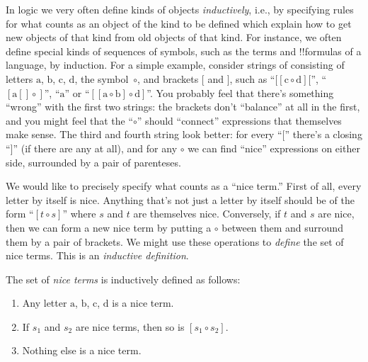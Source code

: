 \documentclass[../../../include/open-logic-section]{subfiles}
\begin{document}


In logic we very often define kinds of objects \emph{inductively},
i.e., by specifying rules for what counts as an object of the kind to
be defined which explain how to get new objects of that kind from old
objects of that kind.  For instance, we often define special kinds of
sequences of symbols, such as the terms and !!{formula}s of a
language, by induction.  For a simple example, consider strings of
consisting of letters $\mathrm{a}$, $\mathrm{b}$, $\mathrm{c}$,
$\mathrm{d}$, the symbol~$\circ$, and brackets $[$ and $]$, such as
``$[[\mathrm{c} \circ \mathrm{d}][$'', ``$[\mathrm{a}[]\circ]$'',
``$\mathrm{a}$'' or ``$[[\mathrm{a} \circ \mathrm{b}]\circ
\mathrm{d}]$''.  You probably feel that there's something
``wrong'' with the first two strings: the brackets don't
``balance'' at all in the first, and you might feel that the
``$\circ$'' should ``connect'' expressions that themselves make
sense. The third and fourth string look better: for every ``$[$''
there's a closing ``$]$'' (if there are any at all), and for any
$\circ$ we can find ``nice'' expressions on either side,
surrounded by a pair of parenteses.

We would like to precisely specify what counts as a ``nice term.''
First of all, every letter by itself is nice.  Anything that's not
just a letter by itself should be of the form ``$[t \circ s]$'' where
$s$ and $t$ are themselves nice. Conversely, if $t$ and $s$ are nice,
then we can form a new nice term by putting a $\circ$ between them and
surround them by a pair of brackets.  We might use these operations
to \emph{define} the set of nice terms.  This is an \emph{inductive
  definition}.

\begin{defn}
  The set of \emph{nice terms} is inductively defined as follows:
  \begin{enumerate}
  \item Any letter $\mathrm{a}$, $\mathrm{b}$, $\mathrm{c}$,
    $\mathrm{d}$ is a nice term.
  \item If $s_1$ and $s_2$ are nice terms, then so
    is $[s_1 \circ s_2]$.
  \item Nothing else is a nice term.
  \end{enumerate}
\end{defn}
\end{document}
